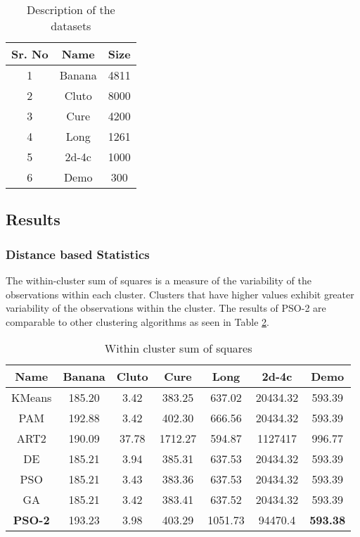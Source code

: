 \documentclass[conference]{IEEEtran}
\begin{document}
\begin{table}[h!]
\renewcommand{\arraystretch}{1.3}
\caption{Description of the datasets}
\label{table}
\centering
\begin{tabular}{|c|c|c|}
  \hline
\multicolumn{1}{|c|}{\textbf{Sr. No}} & \multicolumn{1}{c|}{\textbf{Name}} & \multicolumn{1}{c|}{\textbf{Size}} \\
  \hline
  1 & Banana &  4811 \\
   \hline
  2 & Cluto &  8000 \\
   \hline
  3 & Cure &  4200 \\
   \hline
  4 & Long &  1261 \\
   \hline
  5 & 2d-4c &  1000 \\
   \hline
  6 & Demo &  300 \\
   \hline
\end{tabular}
\end{table}


\subsection{Results}

\subsubsection{Distance based Statistics}

The within-cluster sum of squares is a measure of the variability of the observations within each cluster. Clusters that have higher values exhibit greater variability of the observations within the cluster. The results of PSO-2 are comparable to other clustering algorithms as seen in Table \ref{mwcd}.

\begin{table}[H]
\caption{Within cluster sum of squares}
\label{mwcd}
\centering
\begin{tabular}{||c|c|c|c|c|c|c||}
  \hline
\multicolumn{1}{|c|}{\textbf{Name}} & \multicolumn{1}{c|}{\textbf{Banana}} & \multicolumn{1}{c|}{\textbf{Cluto}} & \multicolumn{1}{c|}{\textbf{Cure}} & \multicolumn{1}{c|}{\textbf{Long}} & \multicolumn{1}{c|}{\textbf{2d-4c}} & \multicolumn{1}{c|}{\textbf{Demo}}\\
  \hline\hline
  KMeans & 185.20 & 3.42 & 383.25 & 637.02 & 20434.32 & 593.39 \\ [0.5ex]
   \hline
  PAM & 192.88 & 3.42 & 402.30 & 666.56 & 20434.32 & 593.39 \\
   \hline
  ART2 & 190.09 & 37.78 & 1712.27 & 594.87 & 1127417 & 996.77 \\
   \hline
  DE & 185.21 & 3.94 & 385.31 & 637.53
 & 20434.32 & 593.39 \\
   \hline
  PSO & 185.21 & 3.43 & 383.36 & 637.53 & 20434.32 & 593.39 \\
   \hline
  GA & 185.21 & 3.42 & 383.41 & 637.52 & 20434.32 & 593.39 \\
   \hline
  \textbf{PSO-2} & 193.23 & 3.98 & 403.29 & 1051.73 &  94470.4 & \textbf{593.38} \\  [1ex]
  \hline
\end{tabular}
\end{table}
\end{document}
